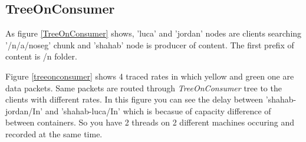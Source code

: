 \subsection{TreeOnConsumer}
As figure \ref{TreeOnConsumer} shows, 'luca' and 'jordan' nodes are clients searching '/n/a/noseg' chunk and 'shahab' node is producer of content. The first prefix of content is /n folder.

Figure \ref{treeonconsumer} shows 4 traced rates in which yellow and green one are data packets. Same packets are routed through \textit{TreeOnConsumer} tree to the clients with different rates. In this figure you can see the delay between 'shahab-jordan/In' and 'shahab-luca/In' which is becasue of capacity difference of between containers. So you have 2 threads on 2 different machines occuring and recorded at the same time.

